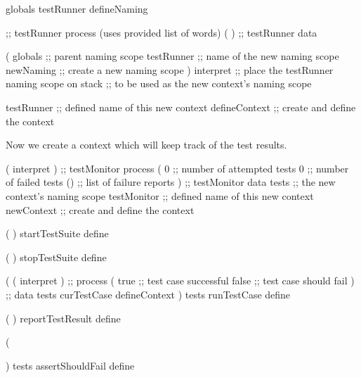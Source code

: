 \startJoylolCode

globals
testRunner
defineNaming

              ;; testRunner process (uses provided list of words)
( 
)             ;; testRunner data

(
  globals     ;; parent naming scope
  testRunner  ;; name of the new naming scope
  newNaming   ;; create a new naming scope
) interpret   ;; place the testRunner naming scope on stack
              ;; to be used as the new context's naming scope

testRunner    ;; defined name of this new context
defineContext ;; create and define the context
\stopJoylolCode

Now we create a context which will keep track of the test results. 

\startJoylolCode
( interpret ) ;; testMonitor process
( 
  0           ;; number of attempted tests
  0           ;; number of failed tests
  ()          ;; list of failure reports
)             ;; testMonitor data
tests         ;; the new context's naming scope
testMonitor   ;; defined name of this new context
newContext    ;; create and define the context
\stopJoylolCode



\stopTestSuite

\starttyping
{}

\startJoylolCode
  (
  )
  startTestSuite
  define
  
  (
  )
  stopTestSuite
  define
\stopJoylolCode

\stopTestSuite
\stoptyping


\startJoylolCode
(
  ( interpret ) ;; process
  (
    true ;; test case successful
    false ;; test case should fail
  ) ;; data
  tests
  curTestCase
  defineContext
)
tests
runTestCase
define
\stopJoylolCode

\stopTestSuite

\startTestSuite[reportTestResult]

\startJoylolCode
  (
  )
  reportTestResult
  define
\stopJoylolCode

\stopTestSuite

\startTestSuite[assertShouldFail]

\startJoylolCode

(
  
)
tests
assertShouldFail
define
\stopJoylolCode

